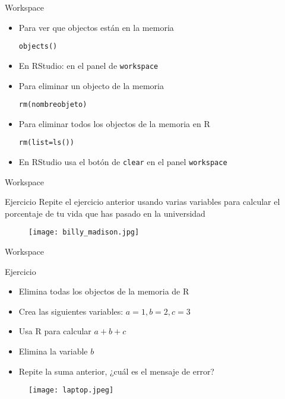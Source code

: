 \documentclass{beamer}
\begin{document}
\begin{frame}[fragile]{Workspace}
\begin{itemize}
\item Para ver que objectos están en la memoria
\begin{verbatim}
objects()
\end{verbatim}
\item En RStudio: en el panel de \verb=workspace=
\item Para eliminar un objecto de la memoria
\begin{verbatim}
rm(nombreobjeto)
\end{verbatim}
\item Para eliminar todos los objectos de la memoria en R
\begin{verbatim}
rm(list=ls())
\end{verbatim}
\item En RStudio usa el botón de \verb=clear= en el panel \verb=workspace=
\end{itemize}
\end{frame}

\begin{frame}[fragile]{Workspace}
\begin{block}{Ejercicio}
Repite el ejercicio anterior usando varias variables para calcular el porcentaje de tu vida que has pasado en la universidad
\end{block}
\begin{figure}[H]
\centering
\texttt{[image: billy\_madison.jpg]}
\end{figure}
\end{frame}
%

\begin{frame}[fragile]{Workspace}
\begin{block}{Ejercicio}
\begin{itemize}
\item Elimina todas los objectos de la memoria de R
\item Crea las siguientes variables: $a=1,b=2,c=3$
\item Usa R para calcular $a+b+c$
\item Elimina la variable $b$
\item Repite la suma anterior, ¿cuál es el mensaje de error?
\end{itemize}
\end{block}
\begin{figure}[H]
\centering
\texttt{[image: laptop.jpeg]}
\end{figure}
\end{frame}
\end{document}
